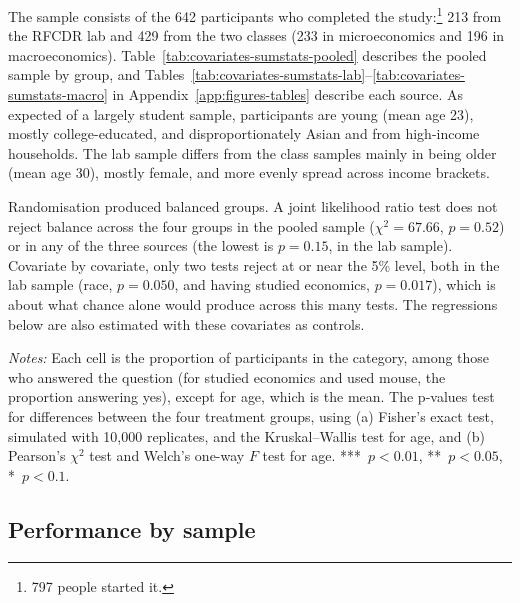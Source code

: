 \documentclass[12pt, letterpaper]{article}
\begin{document}
The sample consists of the 642 participants who completed the study:\footnote{797 people started it.} 213 from the RFCDR lab and 429 from the two classes (233 in microeconomics and 196 in macroeconomics). Table~\ref{tab:covariates-sumstats-pooled} describes the pooled sample by group, and Tables~\ref{tab:covariates-sumstats-lab}--\ref{tab:covariates-sumstats-macro} in Appendix~\ref{app:figures-tables} describe each source. As expected of a largely student sample, participants are young (mean age 23), mostly college-educated, and disproportionately Asian and from high-income households. The lab sample differs from the class samples mainly in being older (mean age 30), mostly female, and more evenly spread across income brackets.

Randomisation produced balanced groups. A joint likelihood ratio test does not reject balance across the four groups in the pooled sample ($\chi^2 = 67.66$, $p = 0.52$) or in any of the three sources (the lowest is $p = 0.15$, in the lab sample). Covariate by covariate, only two tests reject at or near the 5\% level, both in the lab sample (race, $p = 0.050$, and having studied economics, $p = 0.017$), which is about what chance alone would produce across this many tests. The regressions below are also estimated with these covariates as controls.

\begin{table}[htbp]
\centering
\caption{Covariates by treatment group (pooled sample)}\label{tab:covariates-sumstats-pooled}
\begin{threeparttable}

\begin{tablenotes}[flushleft]
\footnotesize
\item \textit{Notes:} Each cell is the proportion of participants in the category, among those who answered the question (for studied economics and used mouse, the proportion answering yes), except for age, which is the mean. The p-values test for differences between the four treatment groups, using (a) Fisher's exact test, simulated with 10,000 replicates, and the Kruskal--Wallis test for age, and (b) Pearson's $\chi^2$ test and Welch's one-way $F$ test for age. ***~$p<0.01$, **~$p<0.05$, *~$p<0.1$.
\end{tablenotes}
\end{threeparttable}
\end{table}

\subsection{Performance by sample}
\end{document}
